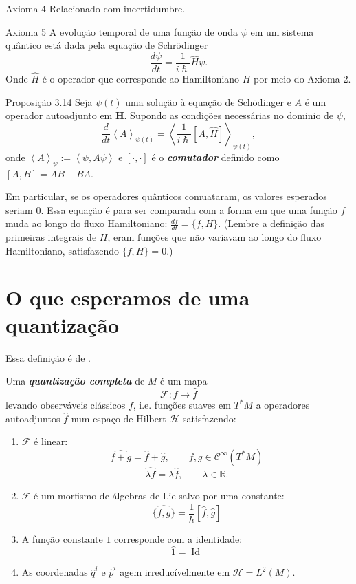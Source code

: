 \begin{thing1}{Axioma 4}\leavevmode
	Relacionado com incertidumbre.
\end{thing1}

\begin{thing1}{Axioma 5}\leavevmode
	A evolução temporal de uma função de onda $\psi$ em um sistema quântico está dada pela equação de Schrödinger
	\[\frac{d\psi}{dt}=\frac{1}{i\hslash}\hat{H}\psi.\]
	Onde $\hat{H}$ é o operador que corresponde ao Hamiltoniano $H$ por meio do Axioma 2.
\end{thing1}

\begin{thing3}{Proposição 3.14}\leavevmode
	Seja $\psi(t)$ uma solução à equação de Schödinger e $A$ é um operador autoadjunto em $\mathbf{H}$. Supondo as condições necessárias no dominio de $\psi$,
	\[\frac{d}{dt}\left<A\right>_{\psi(t)}=\left<\frac{1}{i \hslash}[A,\hat{H}]\right>_{\psi(t)},\]
	onde $\left<A\right>_{\psi}:=\left<\psi,A\psi\right>$ e $[\cdot,\cdot]$ é o \textit{\textbf{comutador}} definido como  $[A,B]=AB-BA$.
\end{thing3}

Em particular, se os operadores quânticos comuataram, os valores esperados seriam 0. Essa equação é para ser comparada com a forma em que uma função $f$ muda ao longo do fluxo Hamiltoniano: $\frac{df}{dt}=\{f,H\}$. (Lembre a definição das primeiras integrais de $H$, eram funções que não variavam ao longo do fluxo Hamiltoniano, satisfazendo $\{f,H\}=0$.)

\section{O que esperamos de uma quantização}

Essa definição é de \cite{k3quant}.
\begin{defn}\leavevmode
	Uma \textit{\textbf{quantização completa}} de $M$ é um mapa
	\[\mathcal{F}:f\longmapsto \hat{f}\]
	levando observáveis clássicos $f $, i.e. funções suaves em $T^*M$ a operadores autoadjuntos $\hat{f}$ num espaço de Hilbert $\mathcal{H}$ satisfazendo:
	\begin{enumerate}
		\item $\mathcal{F}$ é linear:
			\[\widehat{f+g}=\hat{f}+\hat{g},\qquad f,g\in\mathcal{C}^\infty(T^*M)\]
			\[\widehat{\lambda f}=\lambda\hat{f},\qquad \lambda\in\mathbb{R}.\]
	
		\item $ \mathcal{F}$ é um morfismo de álgebras de Lie salvo por uma constante:
			\[\widehat{\{f,g\}}=\frac{1}{\hslash}\left[\hat{f},\hat{g}\right]\]
\item A função constante $1$ corresponde com a identidade:
	\[\hat{1}=\operatorname{Id}\]

	\item As coordenadas $\hat{q}^i$ e $\hat{p}^i$ agem irreducívelmente em $\mathcal{H}=L^2(M)$.
	\end{enumerate}
\end{defn}

